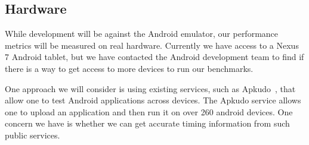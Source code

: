 \subsection{Hardware}

While development will be against the Android emulator, our performance
	metrics will be measured on real hardware.
Currently we have access to a Nexus 7 Android tablet, but we have contacted
	the Android development team to find if there is a way to get
	access to more devices to run our benchmarks.

One approach we will consider is using existing services,
	such as Apkudo~\cite{apkudo}, that allow one to test Android
	applications across devices.
The Apkudo service allows one to upload an application and then run it on 
	over 260 android devices.
One concern we have is whether we can get accurate timing information from
    such public services.

